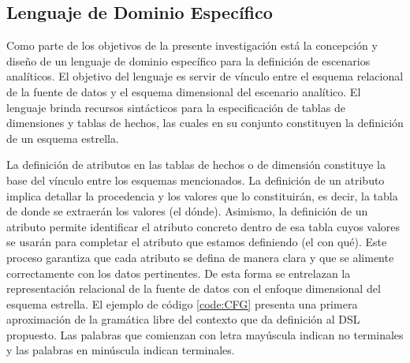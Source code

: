 \subsection{Lenguaje de Dominio Espec\'ifico}

Como parte de los objetivos de la presente investigación est\'a la concepción y diseño de un lenguaje de dominio 
específico para la definición de escenarios analíticos. El objetivo del lenguaje es servir de vínculo 
entre el esquema relacional de la fuente de datos y el esquema dimensional del escenario analítico. El lenguaje 
brinda recursos sintácticos para la especificación de tablas de dimensiones y tablas de hechos, las cuales 
en su conjunto constituyen la definición de un esquema estrella.

La definición de atributos en las tablas de hechos o de dimensión constituye la base del vínculo entre 
los esquemas mencionados. La definición de un atributo 
implica detallar la procedencia y los valores que lo constituirán, es decir, la tabla de donde se extraerán los 
valores (el dónde). Asimismo, la definición de un atributo permite identificar el atributo concreto dentro de esa 
tabla cuyos valores se usarán para completar el atributo 
que estamos definiendo (el con qué). Este proceso garantiza que cada atributo se defina de manera clara y que 
se alimente correctamente con los datos pertinentes. De esta forma se entrelazan la representación relacional 
de la fuente de datos con el enfoque dimensional del esquema estrella. El ejemplo de código \ref{code:CFG} presenta 
una primera aproximación de la gramática 
libre del contexto que da definición al DSL propuesto. Las palabras que comienzan con letra mayúscula indican no terminales y 
las palabras en minúscula indican terminales.

